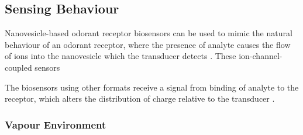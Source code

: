 \documentclass[
  a4paper,
]{scrbook}
\begin{document}
\hypertarget{sec-biosensor-methods}{%
\subsection{Sensing Behaviour}\label{sec-biosensor-methods}}

Nanovesicle-based odorant receptor biosensors can be used to mimic the
natural behaviour of an odorant receptor, where the presence of analyte
causes the flow of ions into the nanovesicle which the transducer
detects \autocite{Lim2015,Dung2018}. These ion-channel-coupled sensors

The biosensors using other formats receive a signal from binding of
analyte to the receptor, which alters the distribution of charge
relative to the transducer .

\hypertarget{vapour-environment}{%
\subsubsection*{Vapour Environment}\label{vapour-environment}}
\end{document}
